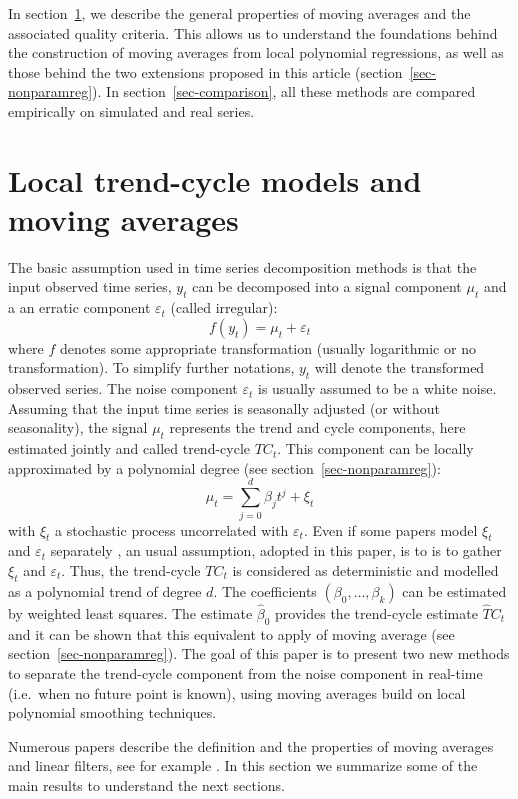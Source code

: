 \documentclass[
]{article}
\newcommand\1{\mathds{1}}
\begin{document}
In section~\ref{sec-propMM}, we describe the general properties of
moving averages and the associated quality criteria. This allows us to
understand the foundations behind the construction of moving averages
from local polynomial regressions, as well as those behind the two
extensions proposed in this article (section~\ref{sec-nonparamreg}). In
section~\ref{sec-comparison}, all these methods are compared empirically
on simulated and real series.

\section{Local trend-cycle models and moving averages}\label{sec-propMM}

The basic assumption used in time series decomposition methods is that
the input observed time series, \(y_t\) can be decomposed into a signal
component \(\mu_t\) and a an erratic component \(\varepsilon_t\) (called
irregular): \[
f(y_t)=\mu_t+\varepsilon_t
\] where \(f\) denotes some appropriate transformation (usually
logarithmic or no transformation). To simplify further notations,
\(y_t\) will denote the transformed observed series. The noise component
\(\varepsilon_t\) is usually assumed to be a white noise. Assuming that
the input time series is seasonally adjusted (or without seasonality),
the signal \(\mu_t\) represents the trend and cycle components, here
estimated jointly and called trend-cycle \(TC_t\). This component can be
locally approximated by a polynomial degree (see
section~\ref{sec-nonparamreg}): \[
\mu_t = \sum_{j=0}^d\beta_jt^j+\xi_t
\] with \(\xi_t\) a stochastic process uncorrelated with
\(\varepsilon_t\). Even if some papers model \(\xi_t\) and
\(\varepsilon_t\) separately \autocite[see for
example][]{GrayThomson2002}, an usual assumption, adopted in this paper,
is to is to gather \(\xi_t\) and \(\varepsilon_t\). Thus, the
trend-cycle \(TC_t\) is considered as deterministic and modelled as a
polynomial trend of degree \(d\). The coefficients
\((\beta_0,\dots,\beta_k)\) can be estimated by weighted least squares.
The estimate \(\hat \beta_0\) provides the trend-cycle estimate
\(\hat TC_t\) and it can be shown that this equivalent to apply of
moving average (see section~\ref{sec-nonparamreg}). The goal of this
paper is to present two new methods to separate the trend-cycle
component from the noise component in real-time (i.e.~when no future
point is known), using moving averages build on local polynomial
smoothing techniques.

Numerous papers describe the definition and the properties of moving
averages and linear filters, see for example \textcite{ch12HBSA}. In
this section we summarize some of the main results to understand the
next sections.
\end{document}
